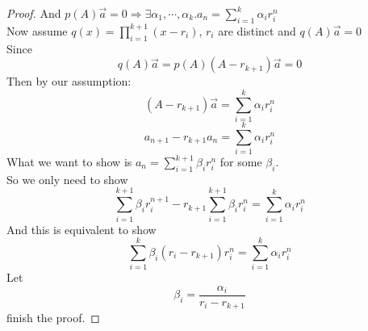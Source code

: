 \begin{proof}
    And $p(A)\vec{a}=0 \Rightarrow \exists\alpha_1, \cdots ,\alpha_k.a_n=\sum_{i=1}^k\alpha_ir_i^n$\\
    Now assume $q(x)=\prod_{i=1}^{k+1}(x-r_i)$, $r_i$ are distinct and $q(A)\vec{a}=0$\\
    Since $$q(A)\vec{a}=p(A)(A-r_{k+1})\vec{a}=0$$
    Then by our assumption: $$(A-r_{k+1})\vec{a}=\sum_{i=1}^k\alpha_ir_i^n$$
    $$a_{n+1}-r_{k+1}a_n=\sum_{i=1}^k\alpha_ir_i^n$$
    What we want to show is $a_n=\sum_{i=1}^{k+1}\beta_ir_i^n$ for some $\beta_i$.\\
    So we only need to show $$\sum_{i=1}^{k+1}\beta_ir_i^{n+1}-r_{k+1}\sum_{i=1}^{k+1}\beta_ir_i^n=\sum_{i=1}^{k}\alpha_ir_i^n$$
    And this is equivalent to show $$\sum_{i=1}^k\beta_i(r_i-r_{k+1})r_i^n=\sum_{i=1}^{k}\alpha_ir_i^n$$
    Let $$\beta_i=\frac{\alpha_i}{r_i-r_{k+1}}$$ finish the proof.
\end{proof}

